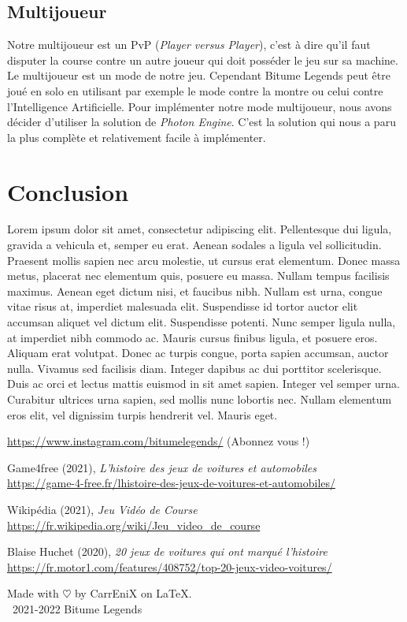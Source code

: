 \documentclass[11pt,a4paper]{article}
\begin{document}
  \subsection{Multijoueur}
    Notre multijoueur est un PvP (\textit{Player versus Player}), c'est à dire qu'il faut disputer la course 
    contre un autre joueur qui doit posséder le jeu sur sa machine. Le multijoueur est un mode de notre jeu. 
    Cependant Bitume Legends peut être joué en solo en utilisant par exemple le mode contre la montre ou 
    celui contre l'Intelligence Artificielle. Pour implémenter notre mode multijoueur, nous avons décider 
    d'utiliser la solution de \emph{Photon Engine}.
    C'est la solution qui nous a paru la plus complète et relativement facile à implémenter.

\clearpage

\section{Conclusion}
  Lorem ipsum dolor sit amet, consectetur adipiscing elit. Pellentesque dui ligula, gravida a vehicula et, semper eu erat. Aenean sodales a ligula vel sollicitudin. Praesent mollis sapien nec arcu molestie, ut cursus erat elementum. Donec massa metus, placerat nec elementum quis, posuere eu massa. Nullam tempus facilisis maximus. Aenean eget dictum nisi, et faucibus nibh. Nullam est urna, congue vitae risus at, imperdiet malesuada elit. Suspendisse id tortor auctor elit accumsan aliquet vel dictum elit. Suspendisse potenti. Nunc semper ligula nulla, at imperdiet nibh commodo ac. Mauris cursus finibus ligula, et posuere eros.
  Aliquam erat volutpat. Donec ac turpis congue, porta sapien accumsan, auctor nulla. Vivamus sed facilisis diam. Integer dapibus ac dui porttitor scelerisque. Duis ac orci et lectus mattis euismod in sit amet sapien. Integer vel semper urna. Curabitur ultrices urna sapien, sed mollis nunc lobortis nec. Nullam elementum eros elit, vel dignissim turpis hendrerit vel. Mauris eget.
\clearpage

\begin{thebibliography}{9}
    \url{https://www.instagram.com/bitumelegends/} (Abonnez vous !)
  
    Game4free (2021), \emph{L'histoire des jeux de voitures et automobiles}\\
    \url{https://game-4-free.fr/lhistoire-des-jeux-de-voitures-et-automobiles/}

    Wikipédia (2021), \emph{Jeu Vidéo de Course} \\
    \url{https://fr.wikipedia.org/wiki/Jeu_video_de_course}

    Blaise Huchet (2020), \emph{20 jeux de voitures qui ont marqué l'histoire}\\
    \url{https://fr.motor1.com/features/408752/top-20-jeux-video-voitures/}

\end{thebibliography}

Made with $\heartsuit$ by CarrEniX on \LaTeX.\\
\textcopyright\, 2021-2022 Bitume Legends
\end{document}
